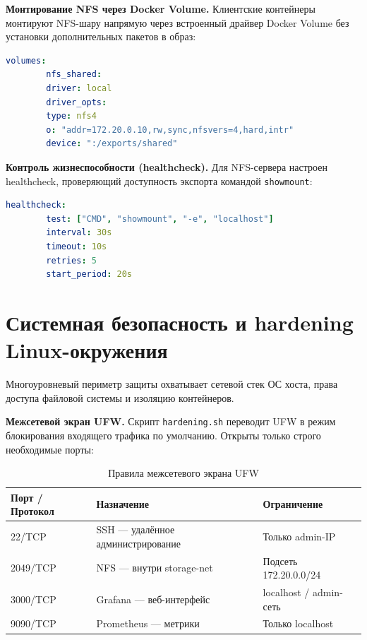 \documentclass[14pt,a4paper]{extarticle}
\begin{document}
	\textbf{Монтирование NFS через Docker Volume.}
	Клиентские контейнеры монтируют NFS-шару напрямую через встроенный драйвер Docker
	Volume без установки дополнительных пакетов в образ:
	
	\begin{lstlisting}[language=yaml, caption={Конфигурация Docker Volume для NFS}]
		volumes:
		nfs_shared:
		driver: local
		driver_opts:
		type: nfs4
		o: "addr=172.20.0.10,rw,sync,nfsvers=4,hard,intr"
		device: ":/exports/shared"
	\end{lstlisting}
	
	\textbf{Контроль жизнеспособности (healthcheck).}
	Для NFS-сервера настроен healthcheck, проверяющий доступность экспорта командой
	\texttt{showmount}:
	
	\begin{lstlisting}[language=yaml, caption={Healthcheck для NFS-сервера}]
		healthcheck:
		test: ["CMD", "showmount", "-e", "localhost"]
		interval: 30s
		timeout: 10s
		retries: 5
		start_period: 20s
	\end{lstlisting}
	
	\newpage
	
	\section{Системная безопасность и hardening Linux-окружения}
	
	Многоуровневый периметр защиты охватывает сетевой стек ОС хоста, права доступа
	файловой системы и изоляцию контейнеров.
	
	\textbf{Межсетевой экран UFW.}
	Скрипт \texttt{hardening.sh} переводит UFW в режим блокирования входящего трафика по
	умолчанию. Открыты только строго необходимые порты:
	
	\begin{table}[h!]
		\centering
		\small
		\begin{tabularx}{\textwidth}{|l|l|X|}
			\hline
			\textbf{Порт / Протокол} & \textbf{Назначение} & \textbf{Ограничение} \\
			\hline
			22/TCP & SSH --- удалённое администрирование & Только admin-IP \\
			\hline
			2049/TCP & NFS --- внутри storage-net & Подсеть 172.20.0.0/24 \\
			\hline
			3000/TCP & Grafana --- веб-интерфейс & localhost / admin-сеть \\
			\hline
			9090/TCP & Prometheus --- метрики & Только localhost \\
			\hline
		\end{tabularx}
		\caption{Правила межсетевого экрана UFW}
	\end{table}
	
\end{document}
